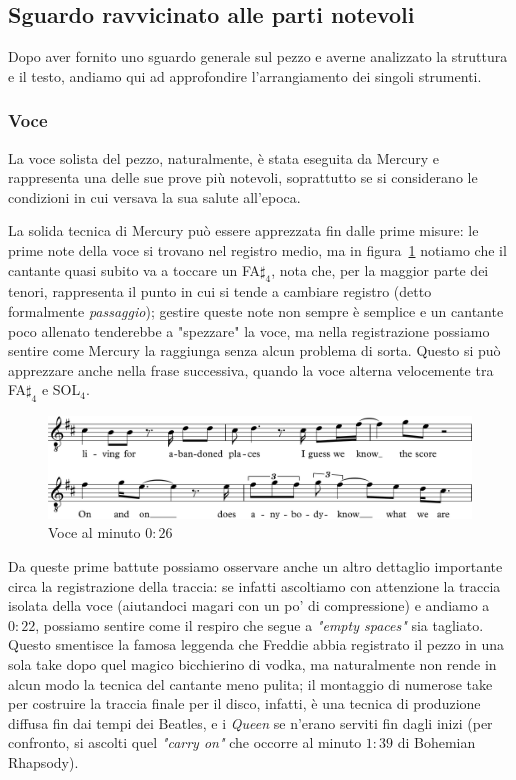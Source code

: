 \documentclass[12pt]{article}
\begin{document}
\subsection{Sguardo ravvicinato alle parti notevoli}
Dopo aver fornito uno sguardo generale sul pezzo e averne analizzato la struttura e il testo, andiamo qui ad approfondire l'arrangiamento dei singoli strumenti.

\subsubsection{Voce}
La voce solista del pezzo, naturalmente, è stata eseguita da Mercury e rappresenta una delle sue prove più notevoli, soprattutto se si considerano le condizioni in cui versava la sua salute all'epoca.

La solida tecnica di Mercury può essere apprezzata fin dalle prime misure: le prime note della voce si trovano nel registro medio, ma in figura~\ref{fig:voice1} notiamo che il cantante quasi subito va a toccare un FA\(\sharp_{4}\), nota che, per la maggior parte dei tenori, rappresenta il punto in cui si tende a cambiare registro (detto formalmente \emph{passaggio}); gestire queste note non sempre è semplice e un cantante poco allenato tenderebbe a "spezzare" la voce, ma nella registrazione possiamo sentire come Mercury la raggiunga senza alcun problema di sorta. Questo si può apprezzare anche nella frase successiva, quando la voce alterna velocemente tra FA\(\sharp_{4}\) e SOL\(_{4}\).

\begin{figure}[H]
 \centering
 \includegraphics[width=\textwidth,keepaspectratio]{vox/voice1}
 \caption{Voce al minuto \(0:26\)}
 \label{fig:voice1}
\end{figure}

Da queste prime battute possiamo osservare anche un altro dettaglio importante circa la registrazione della traccia: se infatti ascoltiamo con attenzione la traccia isolata della voce (aiutandoci magari con un po' di compressione) e andiamo a \(0:22\), possiamo sentire come il respiro che segue a \emph{"empty spaces"} sia tagliato. Questo smentisce la famosa leggenda che Freddie abbia registrato il pezzo in una sola take dopo quel magico bicchierino di vodka, ma naturalmente non rende in alcun modo la tecnica del cantante meno pulita; il montaggio di numerose take per costruire la traccia finale per il disco, infatti, è una tecnica di produzione diffusa fin dai tempi dei Beatles, e i \emph{Queen} se n'erano serviti fin dagli inizi (per confronto, si ascolti quel \emph{"carry on"} che occorre al minuto \(1:39\) di Bohemian Rhapsody).
\end{document}
